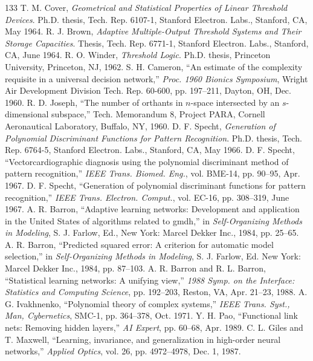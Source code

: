 \documentclass[10pt,twocolumn]{article}
\begin{document}
\begin{thebibliography}{133}
 T. M. Cover, \textit{Geometrical and Statistical Properties of Linear Threshold Devices}. Ph.D. thesis, Tech. Rep. 6107-1, Stanford Electron. Labs., Stanford, CA, May 1964.
 R. J. Brown, \textit{Adaptive Multiple-Output Threshold Systems and Their Storage Capacities}. Thesis, Tech. Rep. 6771-1, Stanford Electron. Labs., Stanford, CA, June 1964.
 R. O. Winder, \textit{Threshold Logic}. Ph.D. thesis, Princeton University, Princeton, NJ, 1962.
 S. H. Cameron, ``An estimate of the complexity requisite in a universal decision network,'' \textit{Proc. 1960 Bionics Symposium}, Wright Air Development Division Tech. Rep. 60-600, pp. 197--211, Dayton, OH, Dec. 1960.
 R. D. Joseph, ``The number of orthants in $n$-space intersected by an $s$-dimensional subspace,'' Tech. Memorandum 8, Project PARA, Cornell Aeronautical Laboratory, Buffalo, NY, 1960.
 D. F. Specht, \textit{Generation of Polynomial Discriminant Functions for Pattern Recognition}. Ph.D. thesis, Tech. Rep. 6764-5, Stanford Electron. Labs., Stanford, CA, May 1966.
 D. F. Specht, ``Vectorcardiographic diagnosis using the polynomial discriminant method of pattern recognition,'' \textit{IEEE Trans. Biomed. Eng.}, vol. BME-14, pp. 90--95, Apr. 1967.
 D. F. Specht, ``Generation of polynomial discriminant functions for pattern recognition,'' \textit{IEEE Trans. Electron. Comput.}, vol. EC-16, pp. 308--319, June 1967.
 A. R. Barron, ``Adaptive learning networks: Development and application in the United States of algorithms related to gmdh,'' in \textit{Self-Organizing Methods in Modeling}, S. J. Farlow, Ed., New York: Marcel Dekker Inc., 1984, pp. 25--65.
 A. R. Barron, ``Predicted squared error: A criterion for automatic model selection,'' in \textit{Self-Organizing Methods in Modeling}, S. J. Farlow, Ed. New York: Marcel Dekker Inc., 1984, pp. 87--103.
 A. R. Barron and R. L. Barron, ``Statistical learning networks: A unifying view,'' \textit{1988 Symp. on the Interface: Statistics and Computing Science}, pp. 192--203, Reston, VA, Apr. 21--23, 1988.
 A. G. Ivakhnenko, ``Polynomial theory of complex systems,'' \textit{IEEE Trans. Syst., Man, Cybernetics}, SMC-1, pp. 364--378, Oct. 1971.
 Y. H. Pao, ``Functional link nets: Removing hidden layers,'' \textit{AI Expert}, pp. 60--68, Apr. 1989.
 C. L. Giles and T. Maxwell, ``Learning, invariance, and generalization in high-order neural networks,'' \textit{Applied Optics}, vol. 26, pp. 4972--4978, Dec. 1, 1987.

\end{thebibliography}
\end{document}
